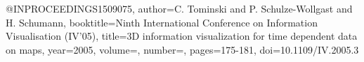 @INPROCEEDINGS{1509075,
  author={C. {Tominski} and P. {Schulze-Wollgast} and H. {Schumann}},
  booktitle={Ninth International Conference on Information Visualisation (IV'05)}, 
  title={3D information visualization for time dependent data on maps}, 
  year={2005},
  volume={},
  number={},
  pages={175-181},
  doi={10.1109/IV.2005.3}}